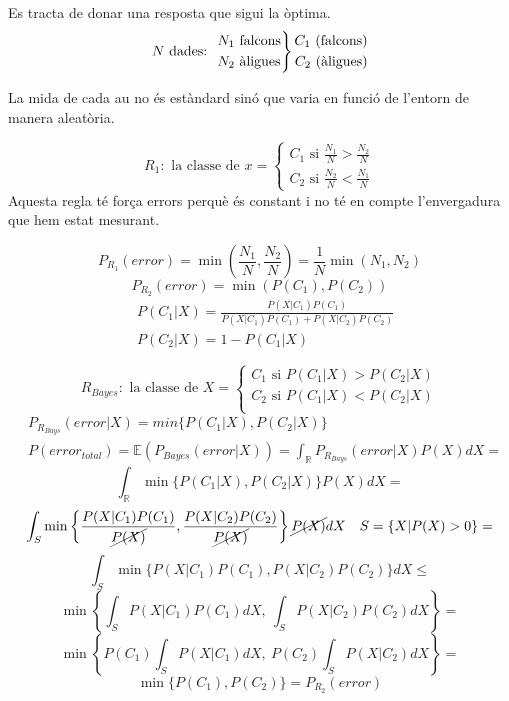 \documentclass[a4paper]{article}
\begin{document}
Es tracta de donar una resposta que sigui la òptima. 
$$
N \text{ dades: }
\begin{rcases*}
N_1 \text{ falcons} \\
N_2 \text{ àligues}
\end{rcases*}
\begin{aligned}
C_1 \text{ (falcons)} \\
C_2 \text{ (àligues)}
\end{aligned}
$$

La mida de cada au no és estàndard sinó que varia en funció de l'entorn de manera aleatòria. 

$$
R_1: \text{ la classe de } x = 
\begin{cases}
C_1 \text{ si } \frac{N_1}{N} > \frac{N_2}{N} \\
C_2 \text{ si } \frac{N_2}{N} < \frac{N_1}{N}
\end{cases}
$$ 
Aquesta regla té força errors perquè és constant i no té en compte l'envergadura que hem estat mesurant.

$$
P_{R_1} (error) = \min\left(\frac{N_1}{N}, \frac{N_2}{N}\right) = \frac{1}{N} \min(N_1, N_2)
$$
$$
P_{R_2} (error) = \min(P(C_1), P(C_2))
$$
\begin{align*}
	& P(C_1 | X) = \frac{P(X|C_1)P(C_1)}{P(X|C_1)P(C_1) + P(X|C_2)P(C_2)} \\
	& P(C_2|X) = 1 - P(C_1|X)
\end{align*}

$$
R_{Bayes}: \text{ la classe de } X =
\begin{cases}
C_1 \text{ si } P(C_1|X) > P(C_2|X) \\
C_2 \text{ si } P(C_1|X) < P(C_2|X) \\
\end{cases}
$$
\begin{align*}
&P_{R_{Bays}} (error|X) = min\{P(C_1|X), P(C_2|X)\} \\
&P(error_{total}) = \mathbb{E}(P_{Bayes} (error|X)) = 
\int_{\mathbb{R}} P_{R_{Bays}} (error|X)P(X)dX =
\end{align*}
$$
\int_{\mathbb{R}} \min\{P(C_1|X),P(C_2|X)\}P(X)dX =
$$
$$
\int_{S} \min\left\{\frac{P(X|C_1)P(C_1)}{\cancel{P(X)}}, \frac{P(X|C_2)P(C_2)}{\cancel{P(X)}}\right\}\cancel{P(X)} dX \quad S = \{X|P(X) > 0\} =
$$
$$
\int_S \min\{ P(X|C_1)P(C_1), P(X|C_2)P(C_2) \} dX \le
$$
$$
\min\left\{ \int_S P(X|C_1)P(C_1) dX,\ \int_S P(X|C_2)P(C_2)dX \right\} =
$$
$$
\min\left\{ P(C_1)\int_S P(X|C_1)dX,\ P(C_2)\int_S P(X|C_2)dX \right\} =
$$
$$
\min \{ P(C_1), P(C_2) \} = P_{R_2} (error)
$$
\end{document}
